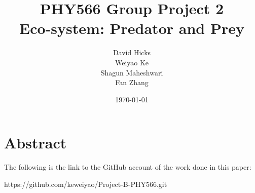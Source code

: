 \documentclass[a4paper,12pt]{article}
\begin{document}
\title{PHY566 Group Project 2 \\ 
	Eco-system: Predator and Prey}
\date{\today}
\author{David Hicks\\ Weiyao Ke \\ Shagun Maheshwari \\ Fan Zhang}

\maketitle
\section{Abstract}

The following is the link to the GitHub account of the work done in this paper: \\
\begin{center}
https://github.com/keweiyao/Project-B-PHY566.git
\end{center}
\end{document}
